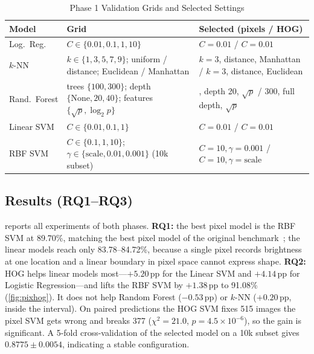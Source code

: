 \documentclass[conference]{IEEEtran}
\newcommand{\pp}{\,pp}                       %
\begin{document}
\begin{table}[t]
  \centering
  \caption{Phase 1 Validation Grids and Selected Settings}
  \label{tab:grids}
  \setlength{\tabcolsep}{3pt}
  \renewcommand{\arraystretch}{1.1}
  \begin{tabular}{@{}>{\raggedright\arraybackslash}p{1.3cm} >{\raggedright\arraybackslash}p{3.2cm} >{\raggedright\arraybackslash}p{3.0cm}@{}}
    \toprule
    Model & Grid & Selected (pixels / HOG) \\
    \midrule
    Log.\ Reg. & $C\in\{0.01,0.1,1,10\}$ & $C=0.01$ / $C=0.01$ \\
    $k$-NN & $k\in\{1,3,5,7,9\}$; uniform / distance; Euclidean / Manhattan
           & $k{=}3$, distance, Manhattan / $k{=}3$, distance, Euclidean \\
    Rand.\ Forest & trees $\{100,300\}$; depth $\{\text{None},20,40\}$; features $\{\sqrt{p},\log_2 p\}$
           & 300, depth 20, $\sqrt{p}$ / 300, full depth, $\sqrt{p}$ \\
    Linear SVM & $C\in\{0.01,0.1,1\}$ & $C=0.01$ / $C=0.01$ \\
    RBF SVM & $C\in\{0.1,1,10\}$; $\gamma\in\{\text{scale},0.01,0.001\}$ (10k subset)
           & $C{=}10,\gamma{=}0.001$ / $C{=}10,\gamma{=}\text{scale}$ \\
    \bottomrule
  \end{tabular}
\end{table}

\subsection{Results (RQ1--RQ3)}
 reports all experiments of both phases. \textbf{RQ1:} the best pixel model is the RBF SVM at 89.70\%,
matching the best pixel model of the original benchmark~\cite{xiao2017fashion}; the linear models reach only 83.78--84.72\%,
because a single pixel records brightness at one location and a linear boundary in pixel space cannot express shape.
\textbf{RQ2:} HOG helps linear models most---$+5.20$\pp{} for the Linear SVM and $+4.14$\pp{} for Logistic
Regression---and lifts the RBF SVM by $+1.38$\pp{} to 91.08\% (\cref{fig:pixhog}). It does not help Random Forest
($-0.53$\pp) or $k$-NN ($+0.20$\pp, inside the interval). On paired predictions the HOG SVM fixes 515 images the pixel
SVM gets wrong and breaks 377 ($\chi^2=21.0$, $p=4.5\times10^{-6}$), so the gain is significant. A 5-fold
cross-validation of the selected model on a 10k subset gives $0.8775\pm0.0054$, indicating a stable configuration.
\end{document}
